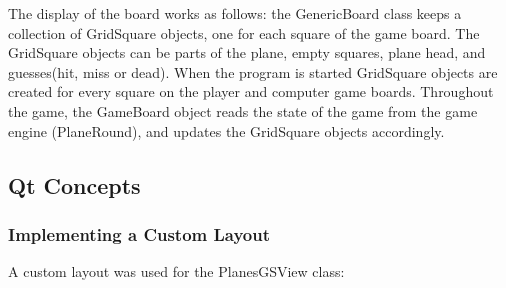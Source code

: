 The display of the board works as follows: the GenericBoard class keeps a collection of GridSquare objects, one for each square of the game board. The GridSquare objects can be parts of the plane, empty squares, plane head, and guesses(hit, miss or dead). When the program is started GridSquare objects are created for every square on the player and computer game boards. Throughout the game, the GameBoard object reads the state of the game from the game engine (PlaneRound), and updates the GridSquare objects accordingly.

\subsection{Qt Concepts}

\subsubsection{Implementing a Custom Layout} \label{custom_qt_layout}

A custom layout was used for the PlanesGSView class:


